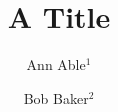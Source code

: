 \documentclass{llncs}

\title{A Title}
\author{Ann Able$^{1}$ \and Bob Baker$^{2}$}
\maketitle
Body.

